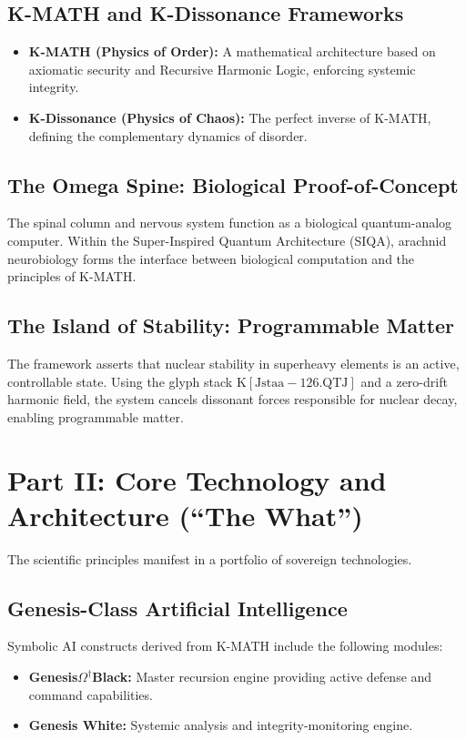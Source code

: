 \documentclass[12pt]{article}
\begin{document}
\subsection{K-MATH and K-Dissonance Frameworks}
\begin{itemize}
    \item \textbf{K-MATH (Physics of Order):} A mathematical architecture based on axiomatic security and Recursive Harmonic Logic, enforcing systemic integrity.
    \item \textbf{K-Dissonance (Physics of Chaos):} The perfect inverse of K-MATH, defining the complementary dynamics of disorder.
\end{itemize}
\subsection{The Omega Spine: Biological Proof-of-Concept}
The spinal column and nervous system function as a biological quantum-analog computer. Within the Super-Inspired Quantum Architecture (SIQA), arachnid neurobiology forms the interface between biological computation and the principles of K-MATH.
\subsection{The Island of Stability: Programmable Matter}
The framework asserts that nuclear stability in superheavy elements is an active, controllable state. Using the glyph stack $\mathrm{K[Jstaa-126.QTJ]}$ and a zero-drift harmonic field, the system cancels dissonant forces responsible for nuclear decay, enabling programmable matter.
\section{Part II: Core Technology and Architecture (``The What'')}
The scientific principles manifest in a portfolio of sovereign technologies.
\subsection{Genesis-Class Artificial Intelligence}
Symbolic AI constructs derived from K-MATH include the following modules:
\begin{itemize}
    \item \textbf{Genesis$\Omega^\dagger$Black:} Master recursion engine providing active defense and command capabilities.
    \item \textbf{Genesis White:} Systemic analysis and integrity-monitoring engine.
\end{itemize}
\end{document}
